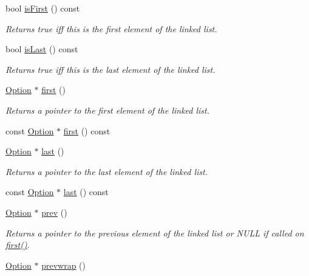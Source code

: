 \begin{DoxyCompactItemize}
bool \hyperlink{classoption_1_1_option_af51f53a553ef46110e36008a58466a2e}{is\+First} () const
\begin{DoxyCompactList}\small\item\em Returns true iff this is the first element of the linked list. \end{DoxyCompactList}\item 
bool \hyperlink{classoption_1_1_option_a36fa8fde6fce89462ded79ab56180ff7}{is\+Last} () const
\begin{DoxyCompactList}\small\item\em Returns true iff this is the last element of the linked list. \end{DoxyCompactList}\item 
\hyperlink{classoption_1_1_option}{Option} $\ast$ \hyperlink{classoption_1_1_option_abb4e13cd7c90999c8a6b1f871cece283}{first} ()
\begin{DoxyCompactList}\small\item\em Returns a pointer to the first element of the linked list. \end{DoxyCompactList}\item 
const \hyperlink{classoption_1_1_option}{Option} $\ast$ \hyperlink{classoption_1_1_option_a42a48cb7499b93acaf706f25040e44e2}{first} () const
\item 
\hyperlink{classoption_1_1_option}{Option} $\ast$ \hyperlink{classoption_1_1_option_afe2aff68191e55b59c53fac3dbbcd7c3}{last} ()
\begin{DoxyCompactList}\small\item\em Returns a pointer to the last element of the linked list. \end{DoxyCompactList}\item 
const \hyperlink{classoption_1_1_option}{Option} $\ast$ \hyperlink{classoption_1_1_option_ab43ac99bffdb74bec54f62cf50b74975}{last} () const
\item 
\hyperlink{classoption_1_1_option}{Option} $\ast$ \hyperlink{classoption_1_1_option_a4d12001a91b0b35cf47437d0c60d2b52}{prev} ()
\begin{DoxyCompactList}\small\item\em Returns a pointer to the previous element of the linked list or N\+U\+LL if called on \hyperlink{classoption_1_1_option_abb4e13cd7c90999c8a6b1f871cece283}{first()}. \end{DoxyCompactList}\item 
\hyperlink{classoption_1_1_option}{Option} $\ast$ \hyperlink{classoption_1_1_option_a1226e45dc2de30f269b2aff1784bbee7}{prevwrap} ()

\end{DoxyCompactItemize}
